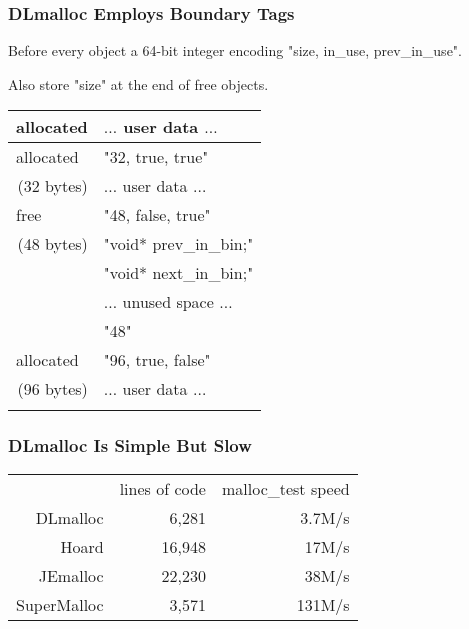 \documentclass[xcolor=dvipsnames,14pt]{beamer}
\begin{document}
\begin{frame}[fragile]
\frametitle{DLmalloc Employs Boundary Tags}

Before every object a 64-bit integer encoding "{size, in_use, prev_in_use}".

Also store "size" at the end of free objects.

\begin{center}
\begin{tabular}{|l|l|}
allocated                         & $\ldots$ user data $\ldots$ \\ \hline
allocated                         & "{32, true, true}"          \\ \cline{2-2}
\multicolumn{1}{|r|}{(32 bytes)}  & $\ldots$ user data $\ldots$ \\ \hline
free                              & "{48, false, true}"         \\ \cline{2-2}
\multicolumn{1}{|r|}{(48 bytes)}  & "void* prev_in_bin;" \\ \cline{2-2}
                                  & "void* next_in_bin;" \\ \cline{2-2}
                                  & $\ldots$ unused space $\ldots$ \\ \cline{2-2}
                                  & "48"                 \\ \hline
allocated                         & "96, true, false"    \\ \cline{2-2}
\multicolumn{1}{|r|}{(96 bytes)}  & $\ldots$ user data $\ldots$ \\ \hline
                &                                   \\
\end{tabular}
\end{center}
\end{frame}

\begin{frame}
\frametitle{DLmalloc Is Simple But Slow}

\begin{tabular}{rrr}
         & lines of code & malloc\_test speed \\
DLmalloc &    6,281 &  3.7M/s \\
Hoard    &   16,948 &  17M/s \\
JEmalloc    & 22,230 & 38M/s\\
SuperMalloc & 3,571 & 131M/s \\
\end{tabular}

\end{frame}
\end{document}
